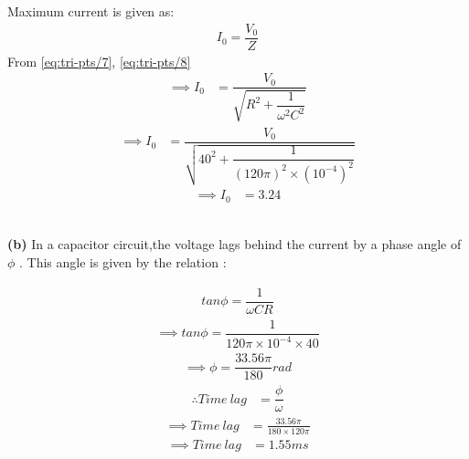 \documentclass[journal,12pt,twocolumn]{IEEEtran}
\theoremstyle{remark}
\begin{document}
Maximum current is given as:
\begin{align}
\label{eq:tri-pts/8}I_0=\dfrac{V_0}{Z}
\end{align}
From \eqref{eq:tri-pts/7}, \eqref{eq:tri-pts/8}\\
\begin{align}
	\label{eq:tri-pts/9}\implies I_0 &=\dfrac{V_0}{\sqrt{R^2 + \dfrac{1}{\omega^2C^2}}}
\end{align}
\begin{align}
	\label{eq:tri-pts/10}\implies I_0 &=\dfrac{V_0}{\sqrt{40^2 + \dfrac{1}{{(120\pi)^2 \times (10^{-4})^2}}}}
\end{align}
\begin{align}
	\label{eq:tri-pts/11}\implies I_0 &=3.24
\end{align}
\\

\begin{flushleft}\textbf{(b)} In a capacitor circuit,the voltage lags behind the current by a phase angle of $\phi$ . This angle is given by the relation
:\\
\end{flushleft}
\begin{align}
	\label{eq:tri-pts/12} tan\phi=\dfrac{1}{\omega CR}
\end{align}
\begin{align}
	\label{eq:tri-pts/13}\implies tan\phi=\dfrac{1}{120\pi \times 10^{-4} \times 40}
\end{align}
\begin{align}
	\label{eq:tri-pts/14}\implies \phi =\dfrac{33.56\pi}{180}rad
\end{align}
\begin{align}
	\label{eq:tri-pts/15} \therefore Time\: lag   &=\dfrac{\phi}{\omega}
\end{align}
\begin{align}
	\label{eq:tri-pts/16}\implies Time\: lag &= \frac{33.56\pi}{180 \times 120\pi}
\end{align}
\begin{align}
	\label{eq:tri-pts/17}\implies Time\: lag &= 1.55ms
\end{align}
\end{document}
